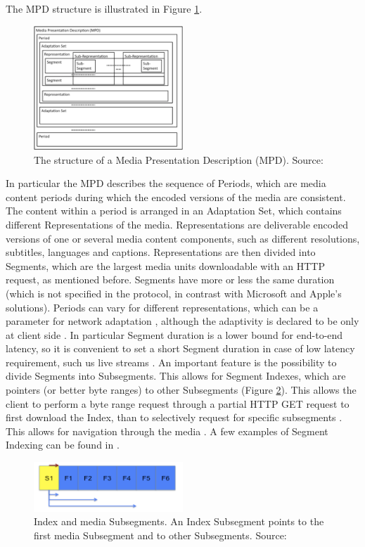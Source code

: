 \documentclass[openany]{book}
\begin{document}
\par The MPD structure is illustrated in Figure \ref{fig:MPD}. 
\begin{figure}[ht]
\centering
\includegraphics[width=0.5\textwidth]{MPD.png}
\caption{\label{fig:MPD}The structure of a Media Presentation Description (MPD). Source: \cite{MPEG}}
\end{figure}
In particular the MPD describes the sequence of Periods, which are media content periods during which the encoded versions of the media are consistent. The content within a period is arranged in an Adaptation Set, which contains different Representations of the media. Representations are deliverable encoded versions of one or several media content components, such as different resolutions, subtitles, languages and captions. Representations are then divided into Segments, which are the largest media units downloadable with an HTTP request, as mentioned before. Segments have more or less the same duration (which is not specified in the protocol, in contrast with Microsoft and Apple’s solutions). Periods can vary for different representations, which can be a parameter for network adaptation \cite{MPEG}, although the adaptivity is declared to be only at client side \cite{MPEG}. In particular Segment duration is a lower bound for end-to-end latency, so it is convenient to set a short Segment duration in case of low latency requirement, such us live streams \cite{MPEG}. An important feature is the possibility to divide Segments into Subsegments. This allows for Segment Indexes, which are pointers (or better byte ranges) to other Subsegments \cite{MPEG, DASH2} (Figure \ref{fig:index}). This allows the client to perform a byte range request through a partial HTTP GET request \cite{HTTP} to first download the Index, than to selectively request for specific subsegments \cite{MPEG, DASH2}. This allows for navigation through the media \cite{DASH2}. A few examples of Segment Indexing can be found in \cite{DASH2}.
\begin{figure}[ht]
\centering
\includegraphics[width=0.5\textwidth]{index.png}
\caption{\label{fig:index}Index and media Subsegments. An Index Subsegment points to the first media Subsegment and to other Subsegments. Source: \cite{DASH2}}
\end{figure}
\end{document}
